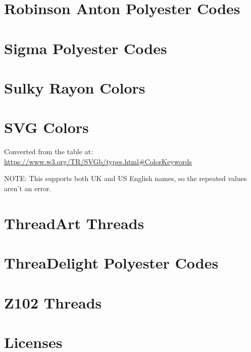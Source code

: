 \documentclass[11pt]{report}
\begin{document}
%

\section{Robinson Anton Polyester Codes}

% 

\section{Sigma Polyester Codes}

%

\section{Sulky Rayon Colors}

%

\section{SVG Colors}

Converted from the table at:
\url{https://www.w3.org/TR/SVGb/types.html#ColorKeywords}

NOTE: This supports both UK and US English names, so the repeated values aren't
an error.

\section{ThreadArt Threads}

% 



\section{ThreaDelight Polyester Codes}

\section{Z102 Threads}



\section{Licenses}



\end{document}
